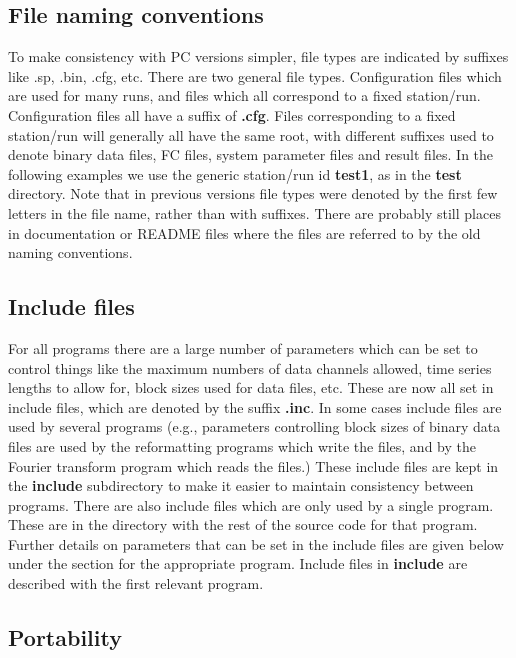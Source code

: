 \subsection{File naming conventions}

To make consistency with PC versions simpler, file types are indicated
by suffixes like .sp, .bin, .cfg, etc.
There are two general file types.  Configuration files
which are used for many runs, and files which all correspond to
a fixed station/run.  Configuration files all have a suffix of {\bf .cfg}.
Files corresponding to a fixed station/run will generally all have
the same root, with different suffixes used to denote binary data files,
FC files, system parameter files and result files.
In the following examples we use the
generic station/run id {\bf test1}, as in the {\bf test} directory.
Note that
in previous versions file types were denoted by the first few letters
in the file name, rather than with suffixes.  There are 
probably still places
in documentation or README files where the files are referred to
by the old naming conventions.

\subsection{Include files}

For all programs there are a large number of parameters which can be set 
to control things like the maximum numbers of data channels allowed,
time series lengths to allow for, block sizes used for data files,
etc.  These are now all set in include files, which are denoted
by the suffix {\bf .inc}.   In some cases include files are used
by several programs (e.g., parameters controlling block sizes of 
binary data files are used by the reformatting programs which
write the files, and by the Fourier transform program which reads
the files.)  These include files are kept in the {\bf include}
subdirectory to make it easier to maintain consistency between
programs.  There are also include files which are only used by
a single program.  These are in the directory with the rest of
the source code for that program.  Further details on parameters that can
be set in the include files are given below under the section for
the appropriate program.   Include files in {\bf include}
are described with the first relevant program.

\subsection{Portability}

